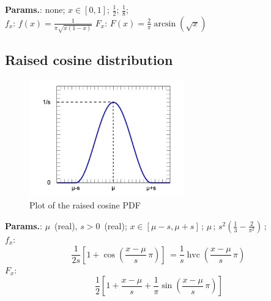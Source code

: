     {\color{darkblue} \textbf{Params.}:} {none}; {$x \in [0,1]$}; {$\frac{1}{2}$}; {$\tfrac{1}{8}$};\hspace{0.5cm}\\{\color{darkblue} \textbf{$f_x$}:} {$f(x) = \frac{1}{\pi\sqrt{x(1-x)}}$}{\color{darkblue} \textbf{$F_x$}:} {$F(x) = \frac{2}{\pi}\arcsin\left(\sqrt x \right)$}



    
        
\subsection{Raised cosine distribution}


    \begin{figure}[H]
        \centering
        \includegraphics[width=0.6\textwidth]{images/Raised cos pdf mod.png}
        \caption{Plot of the raised cosine PDF}
    \end{figure}




    {\color{darkblue} \textbf{Params.}:} {$\mu\,$ (real),  $s>0\,$ (real)}; {$x \in [\mu-s,\mu+s]\,$}; {$\mu\,$}; {$s^2\left(\frac{1}{3}-\frac{2}{\pi^2}\right)\,$};\hspace{0.5cm}\\{\color{darkblue} \textbf{$f_x$}:} {$$\frac{1}{2s}
\left[1+\cos\left(\frac{x-\mu}{s}\,\pi\right)\right]\,=\frac{1}{s}\operatorname{hvc}\left(\frac{x-\mu}{s}\,\pi\right)\,$$}{\color{darkblue} \textbf{$F_x$}:} {$$\frac{1}{2}\left[1+\frac{x-\mu}{s}
+\frac{1}{\pi}\sin\left(\frac{x-\mu}{s}\,\pi\right)\right]$$}




